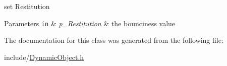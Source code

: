 set Restitution 
\begin{DoxyParams}[1]{Parameters}
\mbox{\tt in}  & {\em p\+\_\+\+Restitution} & the bounciness value \\
\hline
\end{DoxyParams}


The documentation for this class was generated from the following file\+:\begin{DoxyCompactItemize}
\item 
include/\hyperlink{_dynamic_object_8h}{Dynamic\+Object.\+h}\end{DoxyCompactItemize}
